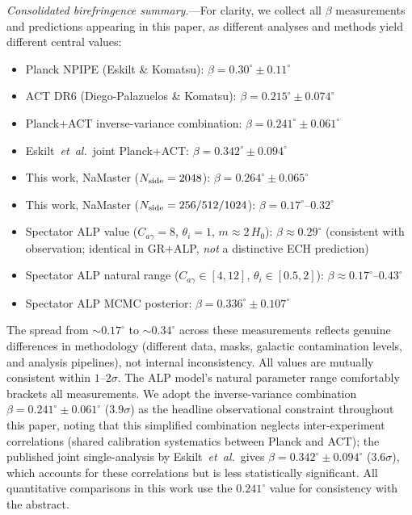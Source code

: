 \documentclass[aps,prd,twocolumn,superscriptaddress,showpacs,preprintnumbers,nofootinbib,longbibliography,floatfix]{revtex4-2}
\newcommand{\etal}{\textit{et~al.}}
\begin{document}
\textit{Consolidated birefringence summary.}---For clarity, we collect all $\beta$ measurements and predictions appearing in this paper, as different analyses and methods yield different central values:
\begin{itemize}[leftmargin=*]
\item Planck NPIPE (Eskilt \& Komatsu): $\beta = 0.30^\circ \pm 0.11^\circ$
\item ACT DR6 (Diego-Palazuelos \& Komatsu): $\beta = 0.215^\circ \pm 0.074^\circ$
\item Planck+ACT inverse-variance combination: $\beta = 0.241^\circ \pm 0.061^\circ$
\item Eskilt~\etal\ joint Planck+ACT: $\beta = 0.342^\circ \pm 0.094^\circ$
\item This work, NaMaster ($N_{\rm side} = 2048$): $\beta = 0.264^\circ \pm 0.065^\circ$
\item This work, NaMaster ($N_{\rm side} = 256/512/1024$): $\beta = 0.17^\circ$--$0.32^\circ$
\item Spectator ALP value ($C_{a\gamma} = 8$, $\theta_i = 1$, $m \approx 2\,H_0$): $\beta \approx 0.29^\circ$ (consistent with observation; identical in GR$+$ALP, \emph{not} a distinctive ECH prediction)
\item Spectator ALP natural range ($C_{a\gamma} \in [4,12]$, $\theta_i \in [0.5,2]$): $\beta \approx 0.17^\circ$--$0.43^\circ$
\item Spectator ALP MCMC posterior: $\beta = 0.336^\circ \pm 0.107^\circ$
\end{itemize}
The spread from ${\sim}0.17^\circ$ to ${\sim}0.34^\circ$ across these measurements reflects genuine differences in methodology (different data, masks, galactic contamination levels, and analysis pipelines), not internal inconsistency. All values are mutually consistent within $1$--$2\sigma$. The ALP model's natural parameter range comfortably brackets all measurements. We adopt the inverse-variance combination $\beta = 0.241^\circ \pm 0.061^\circ$ ($3.9\sigma$) as the headline observational constraint throughout this paper, noting that this simplified combination neglects inter-experiment correlations (shared calibration systematics between Planck and ACT); the published joint single-analysis by Eskilt~\etal\ gives $\beta = 0.342^\circ \pm 0.094^\circ$ ($3.6\sigma$), which accounts for these correlations but is less statistically significant. All quantitative comparisons in this work use the $0.241^\circ$ value for consistency with the abstract.


\end{document}
